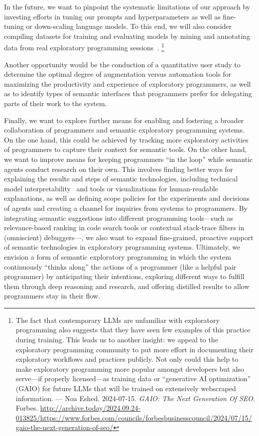 \ParSep

In the future, we want to pinpoint the systematic limitations of our approach by investing efforts in tuning our prompts and hyperparameters as well as fine-tuning or down-scaling language models.
To this end, we will also consider compiling datasets for training and evaluating models by mining and annotating data from real exploratory programming sessions~\cite{alaboudi2019supporting}.
\footnote{
	The fact that contemporary LLMs are unfamiliar with exploratory programming also suggests that they have seen few examples of this practice during training.
	This leads us to another insight: we appeal to the exploratory programming community to put more effort in documenting their exploratory workflows and practices publicly.
	Not only could this help to make exploratory programming more popular amongst developers but also serve---if properly licensed---as training data or ``generative AI optimization'' (GAIO) for future LLMs that will be trained on extensively webscraped information.
	---
	Noa Eshed. 2024-07-15. \emph{GAIO: The Next Generation Of SEO}. Forbes.
	\url{http://archive.today/2024.09.24-013825/https://www.forbes.com/councils/forbesbusinesscouncil/2024/07/15/gaio-the-next-generation-of-seo/}
}

Another opportunity would be the conduction of a quantitative user study to determine the optimal degree of augmentation versus automation tools for maximizing the productivity and experience of exploratory programmers, as well as to identify types of semantic interfaces that programmers prefer for delegating parts of their work to the system.

Finally, we want to explore further means for enabling and fostering a broader collaboration of programmers and semantic exploratory programming systems.
On the one hand, this could be achieved by tracking more exploratory activities of programmers to capture their context for semantic tools.
On the other hand, we want to improve means for keeping programmers ``in the loop'' while semantic agents conduct research on their own.
This involves finding better ways for explaining the results and steps of semantic technologies, including technical model interpretability~\cite{chefer2021generic} and tools or visualizations for human-readable explanations, as well as defining scope policies for the experiments and decisions of agents and creating a channel for inquiries from systems to programmers.
By integrating semantic suggestions into different programming tools---such as relevance-based ranking in code search tools or contextual stack-trace filters in (omniscient) debuggers---, we also want to expand fine-grained, proactive support of semantic technologies in exploratory programming systems.
Ultimately, we envision a form of semantic exploratory programming in which the system continuously ``thinks along'' the actions of a programmer (like a helpful pair programmer) by anticipating their intentions, exploring different ways to fulfill them through deep reasoning and research, and offering distilled results to allow programmers stay in their flow.

